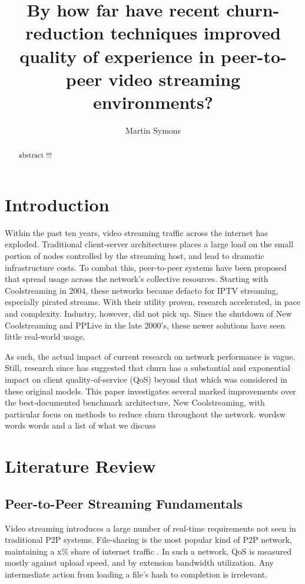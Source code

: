 \documentclass[12pt,a4paper]{article}
\title{By how far have recent churn-reduction techniques improved quality of experience in peer-to-peer video streaming environments?}
\author{Martin Symons}
\begin{document}
\maketitle

\begin{abstract}
abstract !!! 
\end{abstract}

\section{Introduction} \label{introduction}
Within the past ten years, video streaming traffic across the internet has exploded. Traditional client-server architectures places a large load on the small portion of nodes controlled by the streaming host, and lead to dramatic infrastructure costs. To combat this, peer-to-peer systems have been proposed that spread usage across the network's collective resources. Starting with Coolstreaming in 2004, these networks became defacto for IPTV streaming, especially pirated streams. With their utility proven, research accelerated, in pace and complexity. Industry, however, did not pick up. Since the shutdown of New Coolstreaming and PPLive in the late 2000's, these newer solutions have seen little real-world usage.

As such, the actual impact of current research on network performance is vague. Still, research since has suggested that churn has a substantial and exponential impact on client quality-of-service (QoS) beyond that which was considered in these original models. This paper investigates several marked improvements over the best-documented benchmark architecture, New Coolstreaming, with particular focus on methods to reduce churn throughout the network. wordsw words words and a list of what we discuss

\section{Literature Review}  \label{litreview}
\subsection{Peer-to-Peer Streaming Fundamentals} \label{litreview:fundamentals}
Video streaming introduces a large number of real-time requirements not seen in traditional P2P systems. File-sharing is the most popular kind of P2P network, maintaining a x\% share of internet traffic . In such a network, QoS is measured mostly against upload speed, and by extension bandwidth utilization. Any intermediate action from loading a file's hash to completion is irrelevant.
\end{document}
